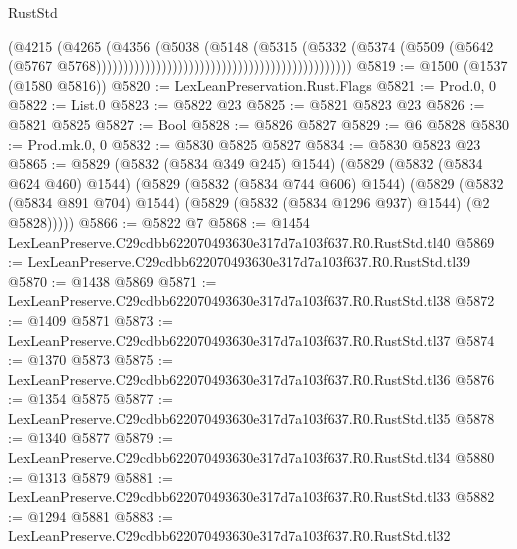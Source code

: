 \begin{lexlean}{RustStd}
\begin{coremodule}
                                                                            (@4215
                                                                              (@4265
                                                                                (@4356
                                                                                  (@5038
                                                                                    (@5148
                                                                                      (@5315
                                                                                        (@5332
                                                                                          (@5374
                                                                                            (@5509
                                                                                              (@5642
                                                                                                (@5767
                                                                                                  @5768)))))))))))))))))))))))))))))))))))))))))))))))
@5819 := @1500 (@1537 (@1580 @5816))
@5820 := LexLeanPreservation.Rust.Flags
@5821 := Prod.{0, 0}
@5822 := List.{0}
@5823 := @5822 @23
@5825 := @5821 @5823 @23
@5826 := @5821 @5825
@5827 := Bool
@5828 := @5826 @5827
@5829 := @6 @5828
@5830 := Prod.mk.{0, 0}
@5832 := @5830 @5825 @5827
@5834 := @5830 @5823 @23
@5865 := @5829
    (@5832 (@5834 @349 @245) @1544)
    (@5829
      (@5832 (@5834 @624 @460) @1544)
      (@5829
        (@5832 (@5834 @744 @606) @1544)
        (@5829
          (@5832 (@5834 @891 @704) @1544)
          (@5829 (@5832 (@5834 @1296 @937) @1544) (@2 @5828)))))
@5866 := @5822 @7
@5868 := @1454 LexLeanPreserve.C29cdbb622070493630e317d7a103f637.R0.RustStd.tl40
@5869 := LexLeanPreserve.C29cdbb622070493630e317d7a103f637.R0.RustStd.tl39
@5870 := @1438 @5869
@5871 := LexLeanPreserve.C29cdbb622070493630e317d7a103f637.R0.RustStd.tl38
@5872 := @1409 @5871
@5873 := LexLeanPreserve.C29cdbb622070493630e317d7a103f637.R0.RustStd.tl37
@5874 := @1370 @5873
@5875 := LexLeanPreserve.C29cdbb622070493630e317d7a103f637.R0.RustStd.tl36
@5876 := @1354 @5875
@5877 := LexLeanPreserve.C29cdbb622070493630e317d7a103f637.R0.RustStd.tl35
@5878 := @1340 @5877
@5879 := LexLeanPreserve.C29cdbb622070493630e317d7a103f637.R0.RustStd.tl34
@5880 := @1313 @5879
@5881 := LexLeanPreserve.C29cdbb622070493630e317d7a103f637.R0.RustStd.tl33
@5882 := @1294 @5881
@5883 := LexLeanPreserve.C29cdbb622070493630e317d7a103f637.R0.RustStd.tl32

\end{coremodule}
\end{lexlean}
